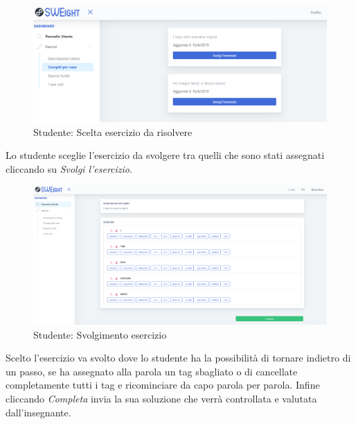         	\begin{figure}[H]
            	\centering
            	\includegraphics[width=17cm]{sez/img/studente/compitopercasa.png} 
            	\caption{Studente: Scelta esercizio da risolvere}\label{fig:1}
        	\end{figure}

		  Lo studente sceglie l'esercizio da svolgere tra quelli che sono stati assegnati cliccando su \textit{Svolgi l'esercizio}.   
       
        	\begin{figure}[H]
            	\centering
            	\includegraphics[width=17cm]{sez/img/studente/svolgimentoesercizio.png} 
            	\caption{Studente: Svolgimento esercizio}\label{fig:1}
        	\end{figure}   
           Scelto l'esercizio va svolto dove lo studente ha la  possibilità di tornare indietro di un passo, se ha assegnato alla parola un tag sbagliato o di cancellate completamente tutti i tag e ricominciare da capo parola per parola. Infine cliccando \textit{Completa} invia la sua soluzione che verrà controllata e valutata dall'insegnante.
        
        
        
        
